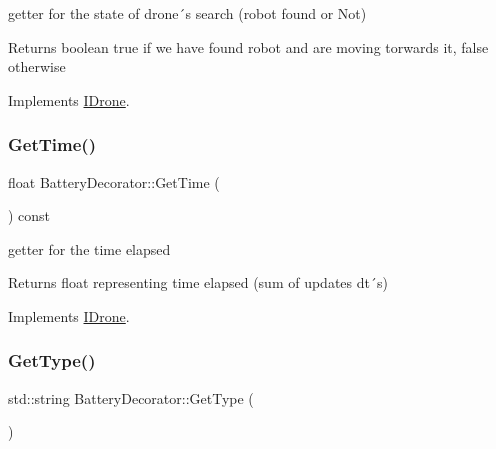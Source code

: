 getter for the state of drone´s search (robot found or Not) 

\begin{DoxyReturn}{Returns}
boolean true if we have found robot and are moving torwards it, false otherwise 
\end{DoxyReturn}


Implements \hyperlink{classIDrone_aed9abde2152408ef3483da57f24c4006}{I\+Drone}.

\mbox{\label{classBatteryDecorator_a87cb6d468b6cd418775b4e01308fc0bf}} 
\subsubsection{\texorpdfstring{Get\+Time()}{GetTime()}}
{\footnotesize\ttfamily float Battery\+Decorator\+::\+Get\+Time (\begin{DoxyParamCaption}{ }\end{DoxyParamCaption}) const\hspace{0.3cm}{\ttfamily [virtual]}}



getter for the time elapsed 

\begin{DoxyReturn}{Returns}
float representing time elapsed (sum of updates dt´s) 
\end{DoxyReturn}


Implements \hyperlink{classIDrone_a18809d1b0626ba66984ef3a91ffb644c}{I\+Drone}.

\mbox{\label{classBatteryDecorator_a606b100a52321dee5c36fe3942f8c396}} 
\subsubsection{\texorpdfstring{Get\+Type()}{GetType()}}
{\footnotesize\ttfamily std\+::string Battery\+Decorator\+::\+Get\+Type (\begin{DoxyParamCaption}{ }\end{DoxyParamCaption})\hspace{0.3cm}{\ttfamily [virtual]}}



